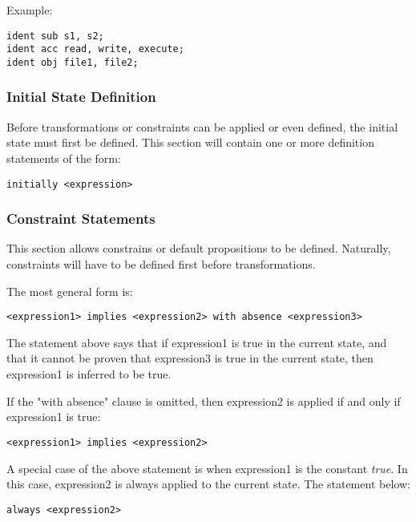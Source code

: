 \documentclass[a4paper]{article}
\begin{document}
        Example:

\begin{verbatim}
ident sub s1, s2;
ident acc read, write, execute;
ident obj file1, file2;
\end{verbatim}

      \subsubsection{Initial State Definition}

        Before transformations or constraints can be applied or even defined,
        the initial state must first be defined. This section will contain
        one or more definition statements of the form:

\begin{verbatim}
initially <expression>
\end{verbatim}

      \subsubsection{Constraint Statements}

        This section allows constrains or default propositions to be defined.
        Naturally, constraints will have to be defined first before
        transformations.

        The most general form is:

\begin{verbatim}
<expression1> implies <expression2> with absence <expression3>
\end{verbatim}

        The statement above says that if expression1 is true in the current
        state, and that it cannot be proven that expression3 is true in
        the current state, then expression1 is inferred to be true.

        If the "with absence" clause is omitted, then expression2 is applied
        if and only if expression1 is true:

\begin{verbatim}
<expression1> implies <expression2>
\end{verbatim}

        A special case of the above statement is when expression1 is the
        constant \emph{true}. In this case, expression2 is always applied
        to the current state. The statement below:

\begin{verbatim}
always <expression2>
\end{verbatim}
\end{document}
